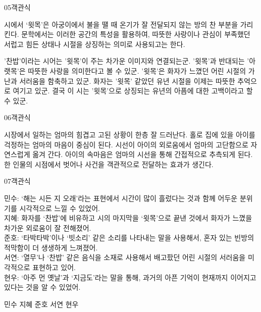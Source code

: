 \documentclass[fs9,seriesRus]{korfarm-base}
\begin{document}
\begin{kfQBlock}{05}{객관식}
\begin{kfEvidence}시에서 ‘윗목’은 아궁이에서 불을 땔 때 온기가 잘 전달되지 않는 방의 찬 부분을 가리킨다. 문학에서는 이러한 공간의 특성을 활용하여, 따뜻한 사랑이나 관심이 부족했던 서럽고 힘든 상태나 시절을 상징하는 의미로 사용되고는 한다.\end{kfEvidence}
\begin{kfChoices}
\kfChoice '찬밥'이라는 시어는 '윗목'이 주는 차가운 이미지와 연결되는군.
\kfChoice '윗목'과 반대되는 '아랫목'은 따뜻한 사랑을 의미한다고 볼 수 있군.
\kfChoice '윗목'은 화자가 느꼈던 어린 시절의 가난과 서러움을 함축하고 있군.
\kfChoice 화자는 '윗목' 같았던 유년 시절을 이제는 따뜻한 추억으로 여기고 있군.
\kfChoice 결국 이 시는 '윗목'으로 상징되는 유년의 아픔에 대한 고백이라고 할 수 있군.
\end{kfChoices}
\end{kfQBlock}
\begin{kfQBlock}{06}{객관식}
\begin{kfChoices}
\kfChoice 시장에서 일하는 엄마의 힘겹고 고된 상황이 한층 잘 드러난다.
\kfChoice 홀로 집에 있을 아이를 걱정하는 엄마의 마음이 중심이 된다.
\kfChoice 시선이 아이의 외로움에서 엄마의 고단함으로 자연스럽게 옮겨 간다.
\kfChoice 아이의 속마음은 엄마의 시선을 통해 간접적으로 추측되게 된다.
\kfChoice 한 인물의 시점에서 벗어나 사건을 객관적으로 전달하는 효과가 생긴다.
\end{kfChoices}
\end{kfQBlock}
\begin{kfQBlock}{07}{객관식}
\begin{kfEvidence}민수: ‘해는 시든 지 오래’라는 표현에서 시간이 많이 흘렀다는 것과 함께 어두운 분위기를 시각적으로 느낄 수 있었어. \\\relax
지혜: 화자를 ‘찬밥’에 비유하고 시의 마지막을 ‘윗목’으로 끝낸 것에서 화자가 느꼈을 차가운 외로움이 잘 전해졌어. \\\relax
준호: ‘타박타박’이나 ‘빗소리’ 같은 소리를 나타내는 말을 사용해서, 혼자 있는 빈방의 적막함이 더 생생하게 느껴졌어. \\\relax
서연: ‘열무’나 ‘찬밥’ 같은 음식을 소재로 사용해서 배고팠던 어린 시절의 서러움을 미각적으로 표현하고 있어. \\\relax
현우: ‘아주 먼 옛날’과 ‘지금도’라는 말을 통해, 과거의 아픈 기억이 현재까지 이어지고 있다는 것을 알 수 있었어.\end{kfEvidence}
\begin{kfChoices}
\kfChoice 민수
\kfChoice 지혜
\kfChoice 준호
\kfChoice 서연
\kfChoice 현우
\end{kfChoices}
\end{kfQBlock}
\end{document}
